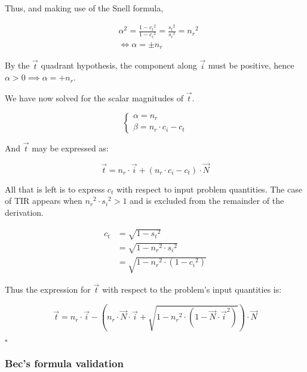 Thus, and making use of the Snell formula,

\begin{equation} \begin{split}
& \alpha^2 = \frac{1 - {c_t}^2}{1 - {c_i}^2} = \frac{{s_t}^2}{{s_i}^2} =
  {n_r}^2 \\
& \iff \alpha = \pm n_r
\end{split} \end{equation}

By the $\overrightarrow{t}$ quadrant hypothesis, the component along
$\overrightarrow{i}$ must be positive, hence $\alpha > 0 \implies \alpha = +
n_r$.

We have now solved for the scalar magnitudes of $\overrightarrow{t}$.

\begin{equation} \begin{cases}
\alpha = n_r \\
\beta = n_r \cdot c_i - c_t
\end{cases} \end{equation}

And $\overrightarrow{t}$ may be expressed as:

\begin{equation}
\overrightarrow{t} = n_r \cdot \overrightarrow{i}
 + (n_r \cdot c_i - c_t) \cdot \overrightarrow{N}
\end{equation}

All that is left is to express $c_t$ with respect to input problem quantities.
The case of \gls{TIR} appears when ${n_r}^2 \cdot {s_i}^2 > 1$ and is excluded
from the remainder of the derivation.

\begin{equation} \begin{split}
c_t &= \sqrt{1 - {s_t}^2} \\
&= \sqrt{1 - {n_r}^2 \cdot {s_i}^2} \\
&= \sqrt{1 - {n_r}^2 \cdot (1 - {c_i}^2)}
\end{split} \end{equation}

Thus the expression for $\overrightarrow{t}$ with respect to the problem's input
quantities is:

\begin{equation}
\overrightarrow{t} = n_r \cdot \overrightarrow{i} -
\left(n_r \cdot \overrightarrow{N} \cdot \overrightarrow{i}
+ \sqrt{1 - {n_r}^2 \cdot \left(1 - 
             {\overrightarrow{N} \cdot \overrightarrow{i}}^2\right)}\right)
\cdot \overrightarrow{N}
\end{equation}

$\square$

\subsubsection{Bec's formula validation}
